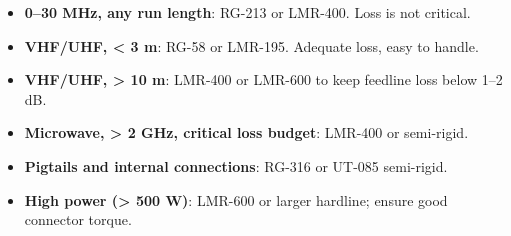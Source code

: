       
\begin{itemize}

        \item \textbf{0–30 MHz, any run length}: RG-213 or LMR-400. Loss is not critical.

        \item \textbf{VHF/UHF, \textless{} 3 m}: RG-58 or LMR-195. Adequate loss, easy to handle.

        \item \textbf{VHF/UHF, \textgreater{} 10 m}: LMR-400 or LMR-600 to keep feedline loss below 1–2 dB.

        \item \textbf{Microwave, \textgreater{} 2 GHz, critical loss budget}: LMR-400 or semi-rigid.

        \item \textbf{Pigtails and internal connections}: RG-316 or UT-085 semi-rigid.

        \item \textbf{High power (\textgreater{} 500 W)}: LMR-600 or larger hardline; ensure good connector torque.

      
\end{itemize}



